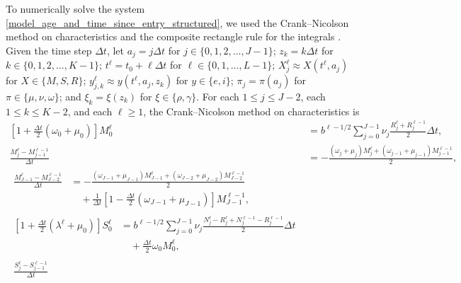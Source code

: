 \documentclass[USenglish]{article}
\begin{document}
To numerically solve the system
\eqref{model_age_and_time_since_entry_structured}, we used the
Crank--Nicolson method on characteristics and the composite rectangle
rule for the integrals \autocite{milner_1992}.  Given the time step
$\Delta t$, let $a_j = j \Delta t$ for
$j \in \{0, 1, 2, \ldots, J - 1\}$;
$z_k = k \Delta t$
for $k \in \{0, 1, 2, \ldots, K - 1\}$;
$t^{\ell} = t_0 + \ell \Delta t$ for
$\ell \in \{0, 1, \ldots, L - 1\}$;
$X_j^{\ell} \approx X(t^{\ell}, a_j)$
for $X \in \{M, S, R\}$;
$y_{j, k}^{\ell} \approx y(t^{\ell}, a_j, z_k)$
for $y \in \{e, i\}$;
$\pi_j = \pi(a_j)$ for $\pi \in \{\mu, \nu, \omega\}$; and
$\xi_k = \xi(z_k)$ for $\xi \in \{\rho, \gamma\}$.
For each $1 \leq j \leq J - 2$, each $1 \leq k \leq K - 2$, and each
$\ell \geq 1$, the Crank--Nicolson method on characteristics is
\begin{subequations}
  \label{numerics_age_and_time_since_entry_structured}
  \begin{align}
    \left[1 + \frac{\Delta t}{2} (\omega_0 + \mu_0)\right] M_0^{\ell}
    &= b^{\ell - 1 / 2}
    \sum_{j = 0}^{J - 1} \nu_j \frac{R_j^{\ell} + R_j^{\ell - 1}}{2}
    \Delta t,
    \\
    \frac{M_j^{\ell} - M_{j - 1}^{\ell - 1}}{\Delta t}
    &=
    - \frac{(\omega_j + \mu_j) M_j^{\ell}
      + (\omega_{j - 1} + \mu_{j - 1}) M_{j - 1}^{\ell - 1}}
    {2},
    \\
    \begin{split}
      \frac{M_{J - 1}^{\ell} - M_{J - 2}^{\ell - 1}}{\Delta t}
      &=
      - \frac{(\omega_{J - 1} + \mu_{J - 1}) M_{J - 1}^{\ell}
        + (\omega_{J - 2} + \mu_{J - 2}) M_{J - 2}^{\ell - 1}}
      {2}
      \\ & \quad {}
      +  \frac{1}{\Delta t} \left[
        1 - \frac{\Delta t}{2} (\omega_{J - 1} + \mu_{J - 1})
      \right] M_{J - 1}^{\ell - 1},
    \end{split}
    \\
    \begin{split}
      \left[1 + \frac{\Delta t}{2} (\lambda^{\ell} + \mu_0)\right] S_0^{\ell}
      &=
      b^{\ell - 1 / 2}
      \sum_{j = 0}^{J - 1} \nu_j
      \frac{N_j^{\ell} - R_j^{\ell} + N_j^{\ell - 1} - R_j^{\ell - 1}}
      {2}
      \Delta t
      \\ & \quad {}
      + \frac{\Delta t}{2} \omega_0 M_0^{\ell},
    \end{split}
    \\
    \begin{split}
      \frac{S_j^{\ell} - S_{j - 1}^{\ell - 1}}{\Delta t}

\end{split}
\end{align}
\end{subequations}
\end{document}

